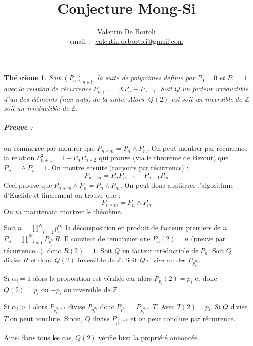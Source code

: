 \documentclass[10pt,a4paper]{article}
\title{Conjecture Mong-Si}
\author{Valentin De Bortoli \\ email : \ \href{mailto:valentin.debortoli@gmail.com}{valentin.debortoli@gmail.com}}
\date{}
\newtheorem{thm}{Théorème}
\begin{document}
\maketitle
\begin{thm}
Soit $(P_n)_{n \in \mathbb{N}}$ la suite de polynômes définie par $P_0=0$ et $P_1=1$ avec la relation de récurrence $P_{n+1}=XP_n-P_{n-1}$. Soit $Q$ un facteur irréductible d'un des éléments (non-nuls) de la suite. Alors, $Q(2)$ est soit un inversible de $\mathbb{Z}$ soit un irréductible de $\mathbb{Z}$.
\end{thm}
\subparagraph{Preuve :} on commence par montrer que $P_{n \wedge m}=P_n \wedge P_m$. On peut montrer par récurrence la relation $P_{n+1}^2=1+P_nP_{n+2}$ qui prouve (via le théorème de Bézout) que $P_{n+1} \wedge P_n =1$. On montre ensuite (toujours par récurrence) :
\begin{equation}
P_{n+m}=P_nP_{m+1}-P_{n-1}P_m
\end{equation}
Ceci prouve que $P_{n+m} \wedge P_n=P_n \wedge P_m$. On peut donc appliquer l'algorithme d'Euclide et finalement on trouve que :
\begin{equation}
\boxed{P_{n \wedge m}=P_n \wedge P_m}
\end{equation}
On va maintenant montrer le théorème.

Soit $n = \underset{i=1}{\overset{N}{\prod}}p_i^{\alpha_i}$ la décomposition en produit de facteurs premiers de $n$. $P_n = \underset{i=1}{\overset{N}{\prod}}P_{p_i^{\alpha_i}} R$. Il convient de remarquer que $P_n(2)=n$ (preuve par récurrence...), donc $R(2)=1$. Soit $Q$ un facteur irréductible de $P_n$. Soit $Q$ divise $R$ et donc $Q(2)$ inversible de $\mathbb{Z}$. Soit $Q$ divise un des $P_{p_i^{\alpha_i}}$. 

Si $\alpha_i=1$ alors la proposition est vérifiée car alors $P_{p_i}(2)=p_i$ et donc $Q(2)=p_i$ ou $-p_i$ ou inversible de $\mathbb{Z}$. 

Si $\alpha_i>1$ alors $P_{p_i^{\alpha_i-1}}$ divise $P_{p_i^{\alpha_i}}$ donc $P_{p_i^{\alpha_i}}=P_{p_i^{\alpha_i-1}} T$. Avec $T(2)=p_i$. Si $Q$ divise $T$ on peut conclure. Sinon, $Q$ divise $P_{p_i^{\alpha_i-1}}$ et on peut conclure par récurrence.

Ainsi dans tous les cas, $Q(2)$ vérifie bien la propriété annoncée.
\end{document}
